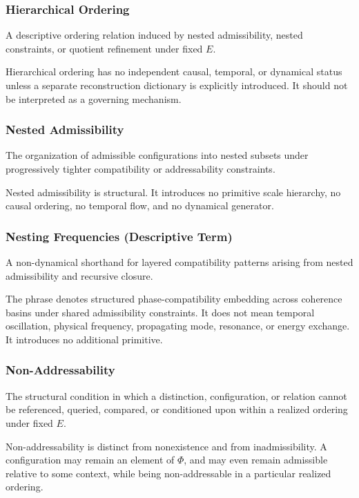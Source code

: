 \documentclass[aps,prx,onecolumn,11pt]{revtex4-2}
\theoremstyle{plain}
\theoremstyle{definition}
\theoremstyle{remark}
\begin{document}
\subsubsection*{Hierarchical Ordering}

A descriptive ordering relation induced by nested admissibility,
nested constraints, or quotient refinement under fixed \(E\).

Hierarchical ordering has no independent causal, temporal, or dynamical
status unless a separate reconstruction dictionary is explicitly
introduced. It should not be interpreted as a governing mechanism.

\subsubsection*{Nested Admissibility}

The organization of admissible configurations into nested subsets under
progressively tighter compatibility or addressability constraints.

Nested admissibility is structural. It introduces no primitive scale
hierarchy, no causal ordering, no temporal flow, and no dynamical
generator.

\subsubsection*{Nesting Frequencies (Descriptive Term)}

A non-dynamical shorthand for layered compatibility patterns arising
from nested admissibility and recursive closure.

The phrase denotes structured phase-compatibility embedding across
coherence basins under shared admissibility constraints. It does not
mean temporal oscillation, physical frequency, propagating mode,
resonance, or energy exchange. It introduces no additional primitive.

\subsubsection*{Non-Addressability}
\label{gloss:nonaddressability}

The structural condition in which a distinction, configuration, or
relation cannot be referenced, queried, compared, or conditioned upon
within a realized ordering under fixed \(E\).

Non-addressability is distinct from nonexistence and from
inadmissibility. A configuration may remain an element of \(\Phi\), and
may even remain admissible relative to some context, while being
non-addressable in a particular realized ordering.
\end{document}
